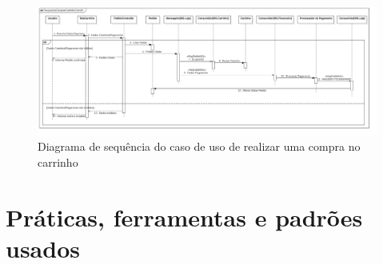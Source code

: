 \begin{figure}[htb]
	\caption{\label{figura-diagrama-de-sequencia}Diagrama de sequência do caso de uso de realizar uma compra no carrinho}
	\begin{center}
	    \includegraphics[scale=0.16]{Diagramas/imagens/SequenciaComprarCarrinhoComAlt.jpg}
	\end{center}
\end{figure}




\section{Práticas, ferramentas e padrões usados}

